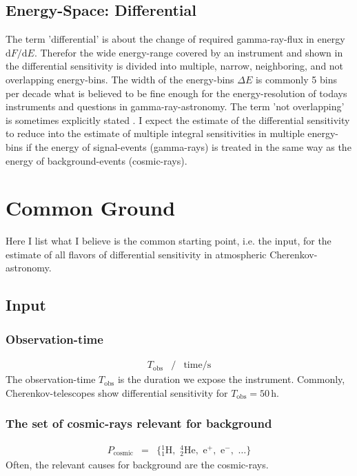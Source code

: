 \documentclass{article}%
\begin{document}
\subsection*{Energy-Space: Differential}
%
The term 'differential' is about the change of required gamma-ray-flux in energy $\mathrm{d}F/\mathrm{d}E$.
%
Therefor the wide energy-range covered by an instrument and shown in the differential sensitivity is divided into multiple, narrow, neighboring, and not overlapping energy-bins.
%
The width of the energy-bins $\Delta E$ is commonly 5 bins per decade what is believed to be fine enough for the energy-resolution of todays instruments and questions in gamma-ray-astronomy.
%
The term 'not overlapping' is sometimes explicitly stated \cite{cta2018baseline}.
%
I expect the estimate of the differential sensitivity to reduce into the estimate of multiple integral sensitivities in multiple energy-bins if the energy of signal-events (gamma-rays) is treated in the same way as the energy of background-events (cosmic-rays).
%
\section{Common Ground}
\label{SecCommonGround}
%
Here I list what I believe is the common starting point, i.e. the input, for the estimate of all flavors of differential sensitivity in atmospheric Cherenkov-astronomy.
%
\subsection{Input}
\subsubsection{Observation-time}
%
\begin{eqnarray*}
T_\text{obs} &/& \text{time} / \text{s}
\end{eqnarray*}
%
The observation-time $T_\text{obs}$ is the duration we expose the instrument.
%
Commonly, Cherenkov-telescopes show differential sensitivity for $T_\text{obs} = 50\,$h.
%
\subsubsection{The set of cosmic-rays relevant for background}
%
\begin{eqnarray*}
P_\text{cosmic} &=& \{ {_1^1}\text{H},\,\,{_2^4}\text{He},\,\,\text{e}^{+},\,\,\text{e}^{-},\,\,\dots{}\}
\end{eqnarray*}
%
Often, the relevant causes for background are the cosmic-rays.
%
%
\end{document}
